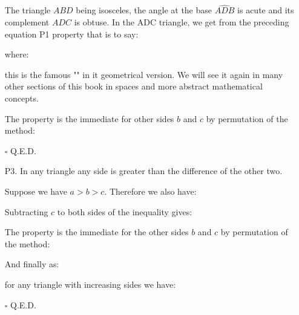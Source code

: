 \begin{enumerate}
\begin{dem}
		The triangle $ABD$ being isosceles, the angle at the base $\widehat{ADB}$ is acute and its complement $\widehat{ADC}$ is obtuse. In the ADC triangle, we get from the preceding equation P1 property that is to say:
		
		where:
		
		this is the famous "" in it geometrical version. We will see it again in many other sections of this book in spaces and more abstract mathematical concepts.
	
		The property is the immediate for other sides $b$ and $c$ by permutation of the method:
		
		\begin{flushright}
			$\square$  Q.E.D.
		\end{flushright}
		\end{dem}


		\item[P3.] In any triangle any side is greater than the difference of the other two.
		\begin{dem}
		Suppose we have $a>b>c$. Therefore we also have:
		
		Subtracting $c$ to both sides of the inequality gives:
		
		The property is the immediate for the other sides $b$ and $c$ by permutation of the method:
		
		And finally as:
		
		for any triangle with increasing sides we have:
		
		\begin{flushright}
			$\square$  Q.E.D.
		\end{flushright}
		\end{dem}
	\end{enumerate}
	

